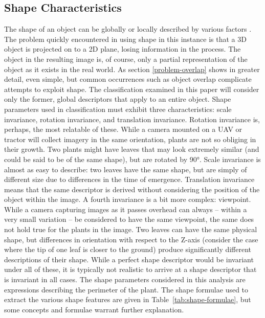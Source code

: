 \documentclass[letterpaper]{article}
\begin{document}
{{\subsection{Shape Characteristics}
The shape of an object can be globally or locally described by various factors \parencite{Zhang2004-cm}. The problem quickly encountered in using shape in this instance is that a 3D object is projected on to a 2D plane, losing information in the process. The object in the resulting image is, of course, only a partial representation of the object as it exists in the real world. As section \ref{problem-overlap} shows in greater detail, even simple, but common occurrences such as object overlap complicate attempts to exploit shape. The classification examined in this paper will consider only the former, global descriptors that apply to an entire object. Shape parameters used in classification must exhibit three characteristics: scale invariance, rotation invariance, and translation invariance. Rotation invariance is, perhaps, the most relatable of these. While a camera mounted on a UAV or tractor will collect imagery in the same orientation, plants are not so obliging in their growth. Two plants might have leaves that may look extremely similar (and could be said to be of the same shape), but are rotated by 90\si{\degree}. Scale invariance is almost as easy to describe: two leaves have the same shape, but are simply of different size due to differences in the time of emergence. Translation invariance means that the same descriptor is derived without considering the position of the object within the image.  A fourth invariance is a bit more complex: viewpoint. While a camera capturing images as it passes overhead can always -- within a very small variation -- be considered to have the same viewpoint, the same does not hold true for the plants in the image. Two leaves can have the same physical shape, but differences in orientation with respect to the Z-axis (consider the case where the tip of one leaf is closer to the ground) produce significantly different descriptions of their shape. While a perfect shape descriptor would be invariant under all of these, it is typically not realistic to arrive at a shape descriptor that is invariant in all cases.
The shape parameters considered in this analysis are expressions describing the perimeter of the plant. The shape formulae used to extract the various shape features are given in Table~\ref{tab:shape-formulae}, but some concepts and formulae warrant further explanation.

}}
\end{document}
